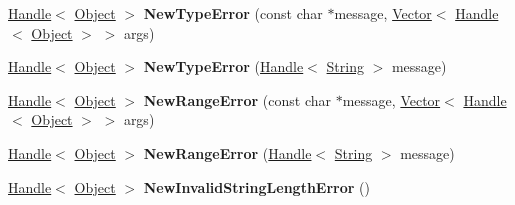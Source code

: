 \begin{DoxyCompactItemize}
\item 
\hypertarget{classv8_1_1internal_1_1_v8___f_i_n_a_l_a8a1a5900b98d5f627003baab1d7a0f47}{}\hyperlink{classv8_1_1internal_1_1_handle}{Handle}$<$ \hyperlink{classv8_1_1internal_1_1_object}{Object} $>$ {\bfseries New\+Type\+Error} (const char $\ast$message, \hyperlink{classv8_1_1internal_1_1_vector}{Vector}$<$ \hyperlink{classv8_1_1internal_1_1_handle}{Handle}$<$ \hyperlink{classv8_1_1internal_1_1_object}{Object} $>$ $>$ args)\label{classv8_1_1internal_1_1_v8___f_i_n_a_l_a8a1a5900b98d5f627003baab1d7a0f47}

\item 
\hypertarget{classv8_1_1internal_1_1_v8___f_i_n_a_l_a879b46b98a5eba223b1b2754bf5c9947}{}\hyperlink{classv8_1_1internal_1_1_handle}{Handle}$<$ \hyperlink{classv8_1_1internal_1_1_object}{Object} $>$ {\bfseries New\+Type\+Error} (\hyperlink{classv8_1_1internal_1_1_handle}{Handle}$<$ \hyperlink{classv8_1_1internal_1_1_string}{String} $>$ message)\label{classv8_1_1internal_1_1_v8___f_i_n_a_l_a879b46b98a5eba223b1b2754bf5c9947}

\item 
\hypertarget{classv8_1_1internal_1_1_v8___f_i_n_a_l_a6346c0b80d1b2d77a09791d73c270d0c}{}\hyperlink{classv8_1_1internal_1_1_handle}{Handle}$<$ \hyperlink{classv8_1_1internal_1_1_object}{Object} $>$ {\bfseries New\+Range\+Error} (const char $\ast$message, \hyperlink{classv8_1_1internal_1_1_vector}{Vector}$<$ \hyperlink{classv8_1_1internal_1_1_handle}{Handle}$<$ \hyperlink{classv8_1_1internal_1_1_object}{Object} $>$ $>$ args)\label{classv8_1_1internal_1_1_v8___f_i_n_a_l_a6346c0b80d1b2d77a09791d73c270d0c}

\item 
\hypertarget{classv8_1_1internal_1_1_v8___f_i_n_a_l_ac68f49b30c36f6b4e99c4abd398fb8e9}{}\hyperlink{classv8_1_1internal_1_1_handle}{Handle}$<$ \hyperlink{classv8_1_1internal_1_1_object}{Object} $>$ {\bfseries New\+Range\+Error} (\hyperlink{classv8_1_1internal_1_1_handle}{Handle}$<$ \hyperlink{classv8_1_1internal_1_1_string}{String} $>$ message)\label{classv8_1_1internal_1_1_v8___f_i_n_a_l_ac68f49b30c36f6b4e99c4abd398fb8e9}

\item 
\hypertarget{classv8_1_1internal_1_1_v8___f_i_n_a_l_af9da64f7687e55de7270abe8598b938a}{}\hyperlink{classv8_1_1internal_1_1_handle}{Handle}$<$ \hyperlink{classv8_1_1internal_1_1_object}{Object} $>$ {\bfseries New\+Invalid\+String\+Length\+Error} ()\label{classv8_1_1internal_1_1_v8___f_i_n_a_l_af9da64f7687e55de7270abe8598b938a}


\end{DoxyCompactItemize}
